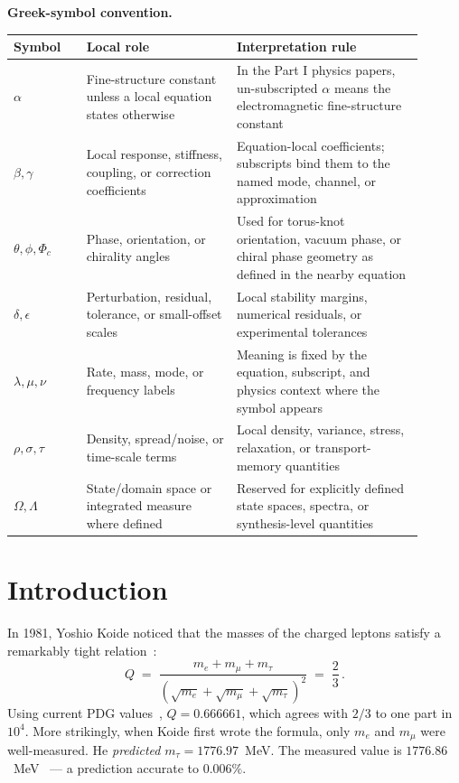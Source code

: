 \documentclass[11pt]{article}
\begin{document}
\noindent\textbf{Greek-symbol convention.}
\begin{center}
{\small
\begin{tabular}{p{0.16\linewidth}p{0.33\linewidth}p{0.41\linewidth}}
\hline
Symbol & Local role & Interpretation rule \\
\hline
$\alpha$ & Fine-structure constant unless a local equation states otherwise & In the Part I physics papers, un-subscripted $\alpha$ means the electromagnetic fine-structure constant \\
$\beta,\gamma$ & Local response, stiffness, coupling, or correction coefficients & Equation-local coefficients; subscripts bind them to the named mode, channel, or approximation \\
$\theta,\phi,\Phi_c$ & Phase, orientation, or chirality angles & Used for torus-knot orientation, vacuum phase, or chiral phase geometry as defined in the nearby equation \\
$\delta,\epsilon$ & Perturbation, residual, tolerance, or small-offset scales & Local stability margins, numerical residuals, or experimental tolerances \\
$\lambda,\mu,\nu$ & Rate, mass, mode, or frequency labels & Meaning is fixed by the equation, subscript, and physics context where the symbol appears \\
$\rho,\sigma,\tau$ & Density, spread/noise, or time-scale terms & Local density, variance, stress, relaxation, or transport-memory quantities \\
$\Omega,\Lambda$ & State/domain space or integrated measure where defined & Reserved for explicitly defined state spaces, spectra, or synthesis-level quantities \\
\hline
\end{tabular}
}
\end{center}


\section{Introduction}

In 1981, Yoshio Koide noticed that the masses of the charged leptons satisfy
a remarkably tight relation~\cite{Koide1983}:
\begin{equation}
  Q \;=\; \frac{m_e + m_\mu + m_\tau}
               {(\sqrt{m_e} + \sqrt{m_\mu} + \sqrt{m_\tau})^2}
  \;=\; \frac{2}{3}\,.
  \label{eq:koide}
\end{equation}
Using current PDG values~\cite{PDG2022}, $Q = 0.666661$, which agrees with $2/3$
to one part in $10^4$.
More strikingly, when Koide first wrote the formula, only $m_e$ and $m_\mu$ were
well-measured. He \emph{predicted} $m_\tau = 1776.97$~MeV. The measured value is
$1776.86$~MeV~\cite{PDG2022} --- a prediction accurate to $0.006\%$.
\end{document}
